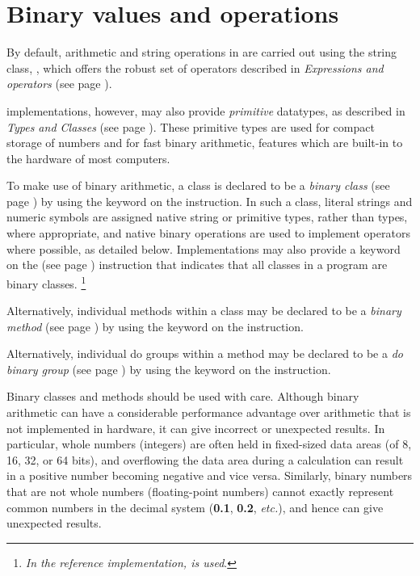 \chapter{Binary values and operations}\label{refbinary}
 
By default, arithmetic and string operations in \nr{} are carried out
using the \nr{} string class, , which offers the robust
set of operators described in \emph{Expressions and operators} (see page \pageref{refexpr}).
 
\nr{} implementations, however, may also provide \emph{primitive}
datatypes, as described in  \emph{Types and Classes} (see page \pageref{refprims}). These primitive types are used for compact storage
of numbers and for fast binary arithmetic, features which are built-in
to the hardware of most computers.
 
To make use of binary arithmetic, a class is declared to be a
 \emph{binary class} (see page \pageref{refbincla})  by using the 
keyword on the  instruction.
In such a class, literal strings and numeric symbols are assigned native
string or primitive types, rather than \nr{} types, where appropriate,
and native binary operations are used to implement operators where
possible, as detailed below.
Implementations may also provide a keyword on the
  (see page \pageref{refoptions})  instruction that indicates that
all classes in a program are binary classes.
\footnote{
\emph{In the reference implementation,  is
used}.
}
 
Alternatively, individual methods within a class may be declared to
be a  \emph{binary method} (see page \pageref{refbinme})  by using the 
keyword on the  instruction.

Alternatively, individual do groups within a method may be declared to
be a  \emph{do binary group} (see page \pageref{refdo})  by using the 
keyword on the  instruction.
 
Binary classes and methods should be used with care.  Although binary
arithmetic can have a considerable performance advantage over
arithmetic that is not implemented in hardware, it can give incorrect
or unexpected results.
In particular, whole numbers (integers) are often held in fixed-sized
data areas (of 8, 16, 32, or 64 bits), and overflowing the data area
during a calculation can result in a positive number becoming negative
and vice versa.
Similarly, binary numbers that are not whole numbers (floating-point
numbers) cannot exactly represent common numbers in the decimal system
(\textbf{0.1}, \textbf{0.2}, \emph{etc.}), and hence can give unexpected
results.
